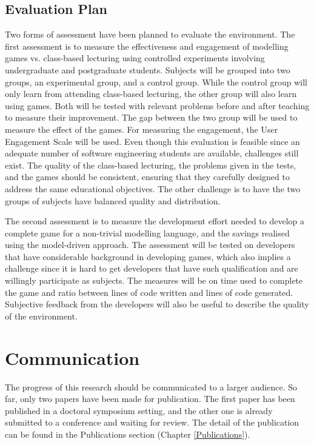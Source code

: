 \documentclass[10pt, a4paper]{report} \usepackage[titletoc]{appendix}
\begin{document}
\subsection{Evaluation Plan}
\label{Evaluation Plan}
Two forms of assessment have been planned to evaluate the environment. The first assessment is to measure the effectiveness and engagement of modelling games vs. class-based lecturing using controlled experiments involving undergraduate and postgraduate students. Subjects will be grouped into two groups, an experimental group, and a control group. While the control group will only learn from attending class-based lecturing, the other group will also learn using games. Both will be tested with relevant problems before and after teaching to measure their improvement. The gap between the two group will be used to measure the effect of the games. For measuring the engagement, the User Engagement Scale \cite{wiebe2014measuring} will be used. Even though this evaluation is feasible since an adequate number of software engineering students are available, challenges still exist. The quality of the class-based lecturing, the problems given in the tests, and the games should be consistent, ensuring that they carefully designed to address the same educational objectives. The other challenge is to have the two groups of subjects have balanced quality and distribution. 
 
The second assessment is to measure the development effort needed to develop a complete game for a non-trivial modelling language, and the savings realised using the model-driven approach. The assessment will be tested on developers that have considerable background in developing games, which also implies a challenge since it is hard to get developers that have such qualification and are willingly participate as subjects. The measures will be on time used to complete the game and ratio between lines of code written and lines of code generated. Subjective feedback from the developers will also be useful to describe the quality of the environment. 

\section{Communication}
The progress of this research should be communicated to a larger audience. So far, only two papers have been made for publication. The first paper has been published in a doctoral symposium setting, and the other one is already submitted to a conference and waiting for review. The detail of the publication can be found in the Publications section (Chapter \ref{Publications}).
\end{document}
